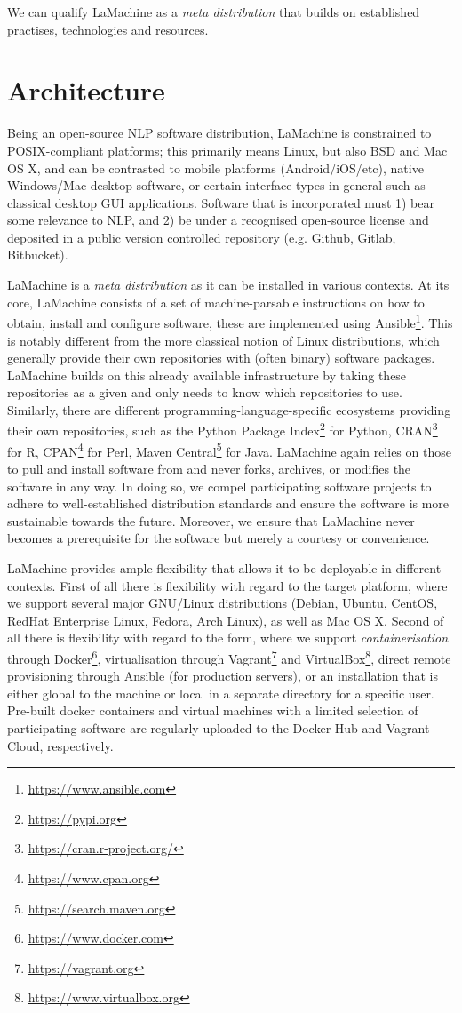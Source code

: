 \documentclass[a4paper,11pt]{article}
\begin{document}
We can qualify LaMachine as a \emph{meta distribution} that builds on established practises, technologies and resources.

\section{Architecture}

Being an open-source NLP software distribution, LaMachine is constrained to POSIX-compliant platforms; this primarily
means Linux, but also BSD and Mac OS X, and can be contrasted to mobile platforms (Android/iOS/etc), native Windows/Mac
desktop software, or certain interface types in general such as classical desktop GUI applications. Software that is
incorporated must 1) bear some relevance to NLP, and 2) be under a recognised open-source license and deposited in a
public version controlled repository (e.g. Github, Gitlab, Bitbucket).

LaMachine is a \emph{meta distribution} as it can be installed in various contexts. At its core, LaMachine consists of a
set of machine-parsable instructions on how to obtain, install and configure software, these are implemented using
Ansible\footnote{\url{https://www.ansible.com}}.  This is notably different from the more classical notion of Linux
distributions, which generally provide their own repositories with (often binary) software packages. LaMachine builds on
this already available infrastructure by taking these repositories as a given and only needs to know which
repositories to use.  Similarly, there are different programming-language-specific ecosystems providing their own
repositories, such as the Python Package Index\footnote{\url{https://pypi.org}} for Python,
CRAN\footnote{\url{https://cran.r-project.org/}} for R, CPAN\footnote{\url{https://www.cpan.org}} for Perl, Maven
Central\footnote{\url{https://search.maven.org}} for Java.  LaMachine again relies on those to pull and install
software from and never forks, archives, or modifies the software in any way. In doing so, we compel participating
software projects to adhere to well-established distribution standards and ensure the software is more sustainable
towards the future. Moreover, we ensure that LaMachine never becomes a prerequisite for the software but merely a
courtesy or convenience.

LaMachine provides ample flexibility that allows it to be deployable in different contexts. First of all there is
flexibility with regard to the target platform, where we support several major GNU/Linux distributions (Debian, Ubuntu,
CentOS, RedHat Enterprise Linux, Fedora, Arch Linux), as well as Mac OS X. Second of all there is flexibility with
regard to the form, where we support \emph{containerisation} through Docker\footnote{\url{https://www.docker.com}}, virtualisation through
Vagrant\footnote{\url{https://vagrant.org}} and VirtualBox\footnote{\url{https://www.virtualbox.org}},
direct remote provisioning through Ansible (for production servers), or an installation that is either global to the
machine or local in a separate directory for a specific user. Pre-built docker containers and virtual machines with a
limited selection of participating software are regularly uploaded to the Docker Hub and Vagrant Cloud, respectively.
\end{document}
